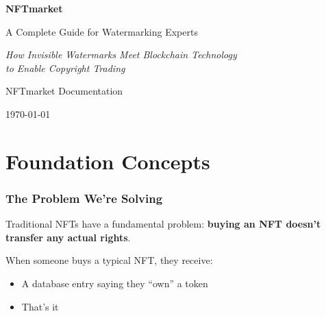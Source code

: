 \documentclass[11pt,a4paper]{article}
\newcommand{\keyword}[1]{\textbf{\textcolor{accentcolor}{#1}}}
\begin{document}
\begin{titlepage}
    \centering
    \vspace*{2cm}

    {\Huge\bfseries NFTmarket\par}
    \vspace{0.5cm}
    {\LARGE A Complete Guide for Watermarking Experts\par}
    \vspace{1cm}
    {\Large\itshape How Invisible Watermarks Meet Blockchain Technology\\to Enable Copyright Trading\par}

    \vfill


    \vfill

    {\large NFTmarket Documentation\par}
    {\large \today\par}
\end{titlepage}

\tableofcontents
\newpage

\part{Foundation Concepts}

\section{The Problem We're Solving}

Traditional NFTs have a fundamental problem: \keyword{buying an NFT doesn't transfer any actual rights}.

When someone buys a typical NFT, they receive:
\begin{itemize}
    \item A database entry saying they ``own'' a token
    \item That's it
\end{itemize}
\end{document}
